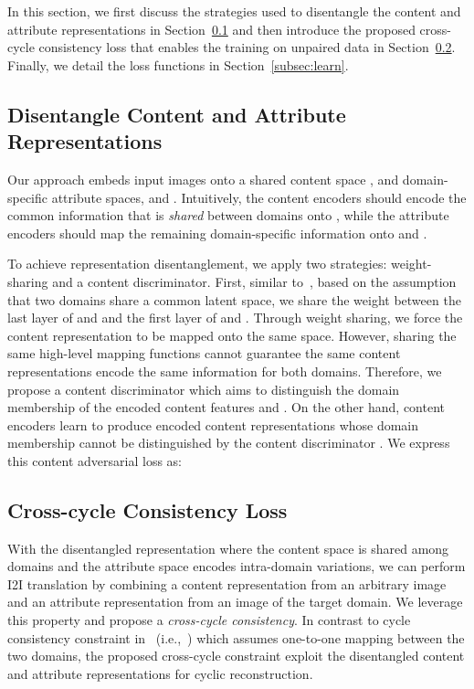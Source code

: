 \documentclass[runningheads]{llncs}
\newlength\secmargin
\newlength\subsecmargin
\newlength\eqmargin
\def\ie{i.e.,~}
\newcommand{\subsecref}[1]{Section~\ref{subsec:#1}}
\begin{document}
In this section, we first discuss the strategies used to disentangle the content and attribute representations in \subsecref{conadv} and then introduce the proposed cross-cycle consistency loss that enables the training on unpaired data in \subsecref{crosscycle}. 
Finally, we detail the loss functions in \subsecref{learn}.

\subsection{Disentangle Content and Attribute Representations}
\label{subsec:conadv}
\vspace{\subsecmargin}
Our approach embeds input images onto a shared content space , and domain-specific attribute spaces,  and .
Intuitively, the content encoders should encode the common information that is \emph{shared} between domains onto , while the attribute encoders should map the remaining domain-specific information onto  and .
\vspace{\eqmargin}

\vspace{\eqmargin}


To achieve representation disentanglement, we apply two strategies: weight-sharing and a content discriminator.
First, similar to~\cite{liu2017unit}, based on the assumption that two domains share a common latent space, we share the weight between the last layer of  and  and the first layer of  and .
Through weight sharing, we force the content representation to be mapped onto the same space.
However, sharing the same high-level mapping functions cannot guarantee the same content representations encode the same information for both domains.
Therefore, we propose a content discriminator  which aims to distinguish the domain membership of the encoded content features  and .
On the other hand, content encoders learn to produce encoded content representations whose domain membership cannot be distinguished by the content discriminator .
We express this content adversarial loss as:
\vspace{\eqmargin}

\vspace{\eqmargin}
\vspace{\eqmargin}

\vspace{\subsecmargin}
\subsection{Cross-cycle Consistency Loss}
\label{subsec:crosscycle}
\vspace{\subsecmargin}
With the disentangled representation where the content space is shared among domains and the attribute space encodes intra-domain variations, we can perform I2I translation by combining a content representation from an arbitrary image and an attribute representation from an image of the target domain.
We leverage this property and propose a \textit{cross-cycle consistency}.
In contrast to cycle consistency constraint in~\cite{zhu2017cyclegan} (\ie{}) which assumes one-to-one mapping between the two domains, the proposed cross-cycle constraint exploit the disentangled content and attribute representations for cyclic reconstruction.
\end{document}
